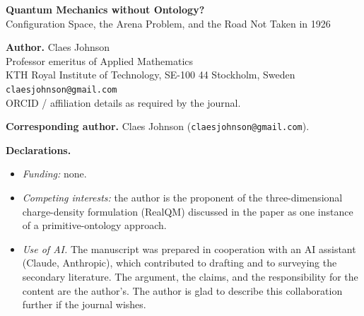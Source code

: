\documentclass[11pt]{article}
\begin{document}
\begin{center}
{\Large\bfseries Quantum Mechanics without Ontology?}\\[0.4em]
{\large Configuration Space, the Arena Problem, and the Road Not Taken in 1926}
\end{center}

\vspace{1.5em}

\noindent\textbf{Author.} Claes Johnson\\
Professor emeritus of Applied Mathematics\\
KTH Royal Institute of Technology, SE-100 44 Stockholm, Sweden\\
\texttt{claesjohnson@gmail.com}\\
ORCID / affiliation details as required by the journal.

\vspace{1em}

\noindent\textbf{Corresponding author.} Claes Johnson (\texttt{claesjohnson@gmail.com}).

\vspace{1em}

\noindent\textbf{Declarations.}
\begin{itemize}
\item \emph{Funding:} none.
\item \emph{Competing interests:} the author is the proponent of the three-dimensional charge-density
formulation (RealQM) discussed in the paper as one instance of a primitive-ontology approach.
\item \emph{Use of AI.} The manuscript was prepared in cooperation with an AI assistant (Claude, Anthropic),
which contributed to drafting and to surveying the secondary literature. The argument, the claims, and the
responsibility for the content are the author's. The author is glad to describe this collaboration further if
the journal wishes.
\end{itemize}

\vspace{1em}
\end{document}
